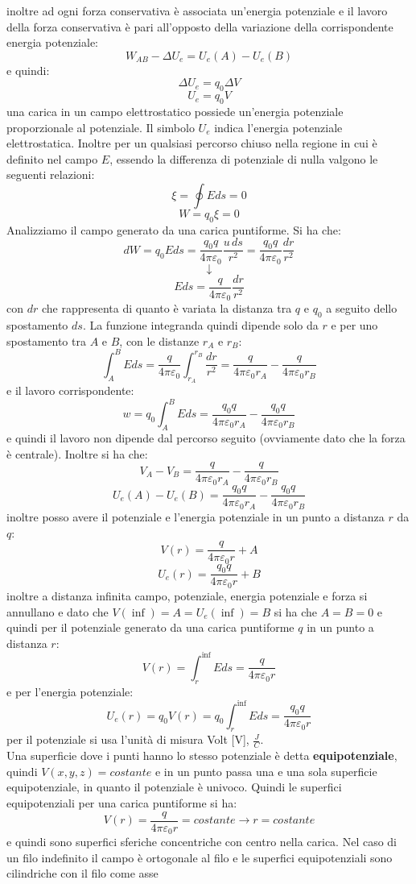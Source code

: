 \documentclass[a4paper,12pt, oneside]{book}
\begin{document}
inoltre ad ogni forza conservativa è associata un'energia potenziale e il lavoro della forza conservativa è pari all'opposto della variazione della corrispondente energia potenziale:
$$W_{AB}-\Delta U_e=U_e(A)-U_e(B)$$
e quindi:
$$\Delta U_e=q_0\Delta V$$
$$U_e=q_0V$$
una carica in un campo elettrostatico possiede un'energia potenziale proporzionale al potenziale. Il simbolo $U_e$ indica l'energia potenziale elettrostatica. Inoltre per un qualsiasi percorso chiuso nella regione in cui è definito nel campo $E$, essendo la differenza di potenziale di nulla valgono le seguenti relazioni:
$$\xi=\oint Eds=0$$
$$W=q_0\xi=0$$
Analizziamo il campo generato da una carica puntiforme. Si ha che:
$$dW=q_0Eds=\frac{q_0q}{4\pi\varepsilon_0}\frac{u\,ds}{r^2}=\frac{q_0q}{4\pi\varepsilon_0}\frac{dr}{r^2}$$
$$\downarrow$$
$$Eds=\frac{q}{4\pi\varepsilon_0}\frac{dr}{r^2}$$
con $dr$ che rappresenta di quanto è variata la distanza tra $q$ e $q_0$ a seguito dello spostamento $ds$. La funzione integranda quindi dipende solo da $r$ e per uno spostamento tra $A$ e $B$, con le distanze $r_A$ e $r_B$:
$$\int_A^B Eds=\frac{q}{4\pi\varepsilon_0}\int_{r_A}^{r_B}\frac{dr}{r^2}=\frac{q}{4\pi\varepsilon_0r_A}-\frac{q}{4\pi\varepsilon_0r_B}$$
e il lavoro corrispondente:
$$w=q_0\int_A^B Eds=\frac{q_0q}{4\pi\varepsilon_0r_A}-\frac{q_0q}{4\pi\varepsilon_0r_B}$$
e quindi il lavoro non dipende dal percorso seguito (ovviamente dato che la forza è centrale). Inoltre si ha che:
$$V_A-V_B=\frac{q}{4\pi\varepsilon_0r_A}-\frac{q}{4\pi\varepsilon_0r_B}$$
$$U_e(A)-U_e(B)=\frac{q_0q}{4\pi\varepsilon_0r_A}-\frac{q_0q}{4\pi\varepsilon_0r_B}$$
inoltre posso avere il potenziale e l'energia potenziale in un punto a distanza $r$ da $q$:
$$V(r)=\frac{q}{4\pi\varepsilon_0r}+A$$
$$U_e(r)=\frac{q_0q}{4\pi\varepsilon_0r}+B$$
inoltre a distanza infinita campo, potenziale, energia potenziale e forza si annullano e dato che $V(\inf)=A=U_e(\inf)=B$ si ha che $A=B=0$ e quindi per il potenziale generato da una carica puntiforme $q$ in un punto a distanza $r$:
$$V(r)=\int_r^{\inf} Eds=\frac{q}{4\pi\varepsilon_0r}$$
e per l'energia potenziale:
$$U_e(r)=q_0V(r)=q_0\int_r^{\inf} Eds=\frac{q_0q}{4\pi\varepsilon_0r}$$
per il potenziale si usa l'unità di misura Volt [V], $\frac{J}{C}$.\\
Una superficie dove i punti hanno lo stesso potenziale è detta \textbf{equipotenziale}, quindi $V(x,y,z)=costante$ e in un punto passa una e una sola superficie equipotenziale, in quanto il potenziale è univoco. Quindi le superfici equipotenziali per una carica puntiforme si ha:
$$V(r)=\frac{q}{4\pi\varepsilon_0r}=costante\longrightarrow r=costante$$
e quindi sono superfici sferiche concentriche con centro nella carica. Nel caso di un filo indefinito il campo è ortogonale al filo e le superfici equipotenziali sono cilindriche con il filo come asse
\end{document}

